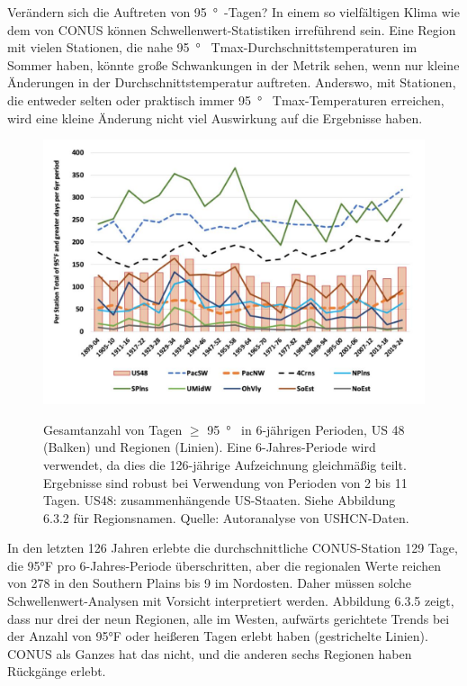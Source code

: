 \documentclass[12pt,paper=a4,DIV=12,parskip=never,chapterprefix=false,headings=standardclasses]{scrreprt}
\begin{document}
Verändern sich die Auftreten von \SI{95}{\degree{}}-Tagen? In einem so vielfältigen Klima wie dem von CONUS können Schwellenwert-Statistiken irreführend sein. Eine Region mit vielen Stationen, die nahe \SI{95}{\degree{}} Tmax-Durchschnittstemperaturen im Sommer haben, könnte große Schwankungen in der Metrik sehen, wenn nur kleine Änderungen in der Durchschnittstemperatur auftreten. Anderswo, mit Stationen, die entweder selten oder praktisch immer \SI{95}{\degree{}} Tmax-Temperaturen erreichen, wird eine kleine Änderung nicht viel Auswirkung auf die Ergebnisse haben.

\begin{figure}[H]
\begin{center}
\includegraphics[width=1.0\textwidth]{bilder/bilderKlima-0046.jpg}\\[1cm]
\end{center}
\caption{Gesamtanzahl von Tagen $\geq$ \SI{95}{\degree{}} in 6-jährigen Perioden, US 48 (Balken) und Regionen (Linien). Eine 6-Jahres-Periode wird verwendet, da dies die 126-jährige Aufzeichnung gleichmäßig teilt. Ergebnisse sind robust bei Verwendung von Perioden von 2 bis 11 Tagen. US48: zusammenhängende US-Staaten. Siehe Abbildung 6.3.2 für Regionsnamen. Quelle: Autoranalyse von USHCN-Daten.}
\end{figure}

In den letzten 126 Jahren erlebte die durchschnittliche CONUS-Station 129 Tage, die 95°F pro 6-Jahres-Periode überschritten, aber die regionalen Werte reichen von 278 in den Southern Plains bis 9 im Nordosten. Daher müssen solche Schwellenwert-Analysen mit Vorsicht interpretiert werden. Abbildung 6.3.5 zeigt, dass nur drei der neun Regionen, alle im Westen, aufwärts gerichtete Trends bei der Anzahl von 95°F oder heißeren Tagen erlebt haben (gestrichelte Linien). CONUS als Ganzes hat das nicht, und die anderen sechs Regionen haben Rückgänge erlebt.
\end{document}
